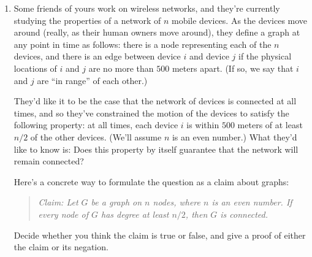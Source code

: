 \documentclass[12pt]{article}
\begin{document}
\begin{enumerate}


\item 

Some friends of yours work on wireless networks,
and they're currently studying the properties of a
network of $n$ mobile devices.
As the devices move around (really, as their human owners move around),
they define a graph at any point in time as follows:
there is a node representing each of the $n$ devices, and
there is an edge between device $i$ and device $j$
if the physical locations of $i$ and $j$
are no more than $500$ meters apart.
(If so, we say that $i$ and $j$ are ``in range'' of each other.)

They'd like it to be the case that the network of devices
is connected at all times, and so they've constrained
the motion of the devices to satisfy the following property:
at all times, each device $i$ is within $500$ meters of at
least $n/2$ of the other devices.
(We'll assume $n$ is an even number.)
What they'd like to know is: Does this property by itself
guarantee that the network will remain connected?

Here's a concrete way to formulate the question as
a claim about graphs:
\begin{quote}
{\em Claim: Let $G$ be a graph on $n$ nodes, where $n$
is an even number.  If every node of $G$ has degree at least $n/2$,
then $G$ is connected.}
\end{quote}
Decide whether you think the claim is true or false,
and give a proof of either the claim or its negation.


\end{enumerate}
\end{document}
